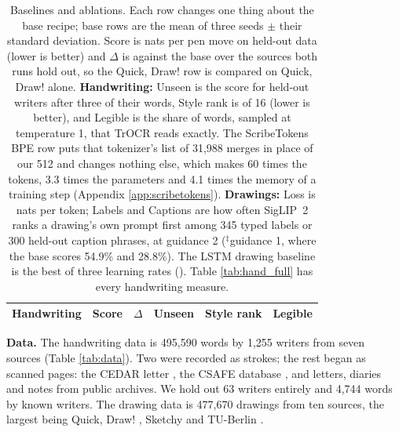 \documentclass{article}
\begin{document}
\begin{table}[!t]
\caption{Baselines and ablations. Each row changes one thing about the base recipe; base rows are the mean of three seeds $\pm$ their standard deviation. Score is nats per pen move on held-out data (lower is better) and $\Delta$ is against the base over the sources both runs hold out, so the Quick, Draw! row is compared on Quick, Draw! alone. \textbf{Handwriting:} Unseen is the score for held-out writers after three of their words, Style rank is of 16 (lower is better), and Legible is the share of words, sampled at temperature 1, that TrOCR reads exactly. The ScribeTokens BPE row puts that tokenizer's list of 31,988 merges in place of our 512 and changes nothing else, which makes 60 times the tokens, 3.3 times the parameters and 4.1 times the memory of a training step (Appendix \ref{app:scribetokens}). \textbf{Drawings:} Loss is nats per token; Labels and Captions are how often SigLIP~2 ranks a drawing's own prompt first among 345 typed labels or 300 held-out caption phrases, at guidance 2 ($^\ddagger$guidance 1, where the base scores 54.9\% and 28.8\%). The LSTM drawing baseline is the best of three learning rates (\RecurrentRun). Table \ref{tab:hand_full} has every handwriting measure.}
\label{tab:hand}\label{tab:sketch}
\vskip 0.1in
\begin{center}
\begin{small}
\begin{tabular*}{\textwidth}{@{\extracolsep{\fill}}lccccc}
\toprule
\textbf{Handwriting} & Score & $\Delta$ & Unseen & Style rank & Legible \\
\midrule

\end{tabular*}
\end{small}
\end{center}
\vskip -0.1in
\end{table}

\textbf{Data.} The handwriting data is 495,590 words by 1,255 writers from seven sources (Table \ref{tab:data}). Two were recorded as strokes; the rest began as scanned pages: the CEDAR letter \citep{srihari2002individuality}, the CSAFE database \citep{crawford2020csafe}, and letters, diaries and notes from public archives. We hold out 63 writers entirely and 4,744 words by known writers. The drawing data is 477,670 drawings from ten sources, the largest being Quick, Draw! \citep{ha2018neural}, Sketchy \citep{sangkloy2016sketchy} and TU-Berlin \citep{eitz2012humans}.
\end{document}
